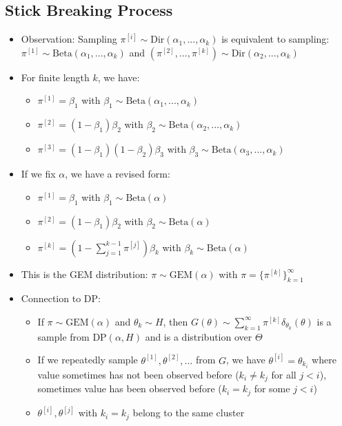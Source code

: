 \subsection*{Stick Breaking Process}
\begin{itemize}
    \item Observation: Sampling $\pi^{[i]} \sim \textrm{Dir}(\alpha_1, ..., \alpha_k)$ is equivalent to sampling:
    $\pi^{[1]} \sim \textrm{Beta}(\alpha_1, ..., \alpha_k)$ and $(\pi^{[2]}, ..., \pi^{[k]}) \sim \textrm{Dir}(\alpha_2, ..., \alpha_k)$
    \item For finite length $k$, we have:
    \begin{itemize}
        \item $\pi^{[1]} = \beta_1$ with $\beta_1 \sim \textrm{Beta}(\alpha_1, ..., \alpha_k)$
        \item $\pi^{[2]} = (1 - \beta_1)\beta_2$ with $\beta_2 \sim \textrm{Beta}(\alpha_2, ..., \alpha_k)$
        \item $\pi^{[3]} = (1 - \beta_1)(1 - \beta_2)\beta_3$ with $\beta_3 \sim \textrm{Beta}(\alpha_3, ..., \alpha_k)$
    \end{itemize}
    \item If we fix $\alpha$, we have a revised form:
    \begin{itemize}
        \item $\pi^{[1]} = \beta_1$ with $\beta_1 \sim \textrm{Beta}(\alpha)$
        \item $\pi^{[2]} = (1 - \beta_1)\beta_2$ with $\beta_2 \sim \textrm{Beta}(\alpha)$
        \item $\pi^{[k]} = (1 - \sum_{j=1}^{k-1} \pi^{[j]})\beta_k$ with $\beta_k \sim \textrm{Beta}(\alpha)$
    \end{itemize}
    \item This is the GEM distribution:
    $\pi \sim \textrm{GEM}(\alpha)$ with $\pi = \{ \pi^{[k]} \}_{k=1}^\infty$
    \item Connection to DP:
    \begin{itemize}
        \item If $\pi \sim \textrm{GEM}(\alpha)$ and $\theta_k \sim H$, then
        $G(\theta) \sim \sum_{k=1}^\infty \pi^{[k]} \delta_{\theta_k}(\theta)$
        is a sample from $\textrm{DP}(\alpha, H)$ and is a distribution over $\Theta$
        \item If we repeatedly sample $\theta^{[1]}, \theta^{[2]}, \dots$ from $G$, we have $\theta^{[i]} = \theta_{k_i}$ where value sometimes has not been observed before ($k_i \neq k_j$ for all $j < i$), sometimes value has been observed before ($k_i = k_j$ for some $j < i$)
        \item $\theta^{[i]}, \theta^{[j]}$ with $k_i = k_j$ belong to the same cluster
    \end{itemize}
\end{itemize}

